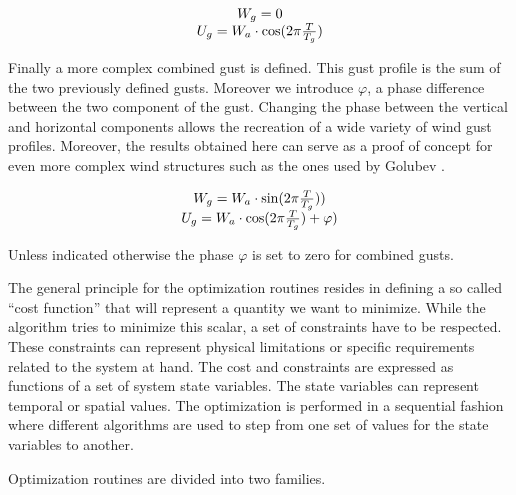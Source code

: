\begin{equation}
\begin{array}[c]{c}
  W_g = 0 \\
  U_g = W_a \cdot \cos(2 \pi \frac{T}{T_g})
\end{array}
\label{eqn:horizontal_gust_definition}
\end{equation}

\par Finally a more complex combined gust is defined.
This gust profile is the sum of the two previously defined gusts.
Moreover we introduce $\varphi$, a phase difference between the two component of the gust. 
Changing the phase between the vertical and horizontal components allows the recreation of a wide variety of wind gust profiles. 
Moreover, the results obtained here can serve as a proof of concept for even more complex wind structures such as the ones used by Golubev \cite{golubev2010high} \cite{golubev2010parametric}.

\begin{equation}
\begin{array}[c]{c}
  W_g = W_a \cdot \sin(2\pi \frac{T}{T_g})) \\
  U_g = W_a \cdot \cos(2 \pi \frac{T}{T_g}) + \varphi)
\end{array}
\label{eqn:combined_gust_definition}
\end{equation}

Unless indicated otherwise the phase $\varphi$ is set to zero for combined gusts.


The general principle for the optimization routines resides in defining a so called ``cost function'' that will represent a quantity we want to minimize.
While the algorithm tries to minimize this scalar, a set of constraints have to be respected. 
These constraints can represent physical limitations or specific requirements related to the system at hand.
The cost and constraints are expressed as functions of a set of system state variables.
The state variables can represent temporal or spatial values.
The optimization is performed in a sequential fashion where different algorithms are used to step from one set of values for the state variables to another. 

\par Optimization routines are divided into two families. 


